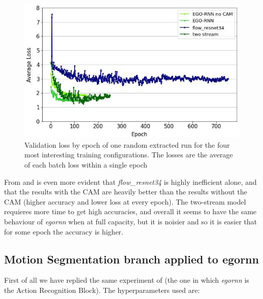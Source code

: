 \documentclass[10pt,twocolumn,hidelinks,letterpaper]{article}
\begin{document}
\begin{figure}[t]
	\centering
	\includegraphics[width=\linewidth]{images/step1_loss.jpg}
	\caption{Validation loss by epoch of one random extracted run for the four most interesting training configurations. The losses are the average of each batch loss within a single epoch}
	\label{step1_loss}
\end{figure}

From  and  is even more evident that \textit{flow\_resnet34} is highly inefficient alone, and that the results with the CAM are heavily better than the results without the CAM (higher accuracy and lower loss at every epoch). The two-stream model requieres more time to get high accuracies, and overall it seems to have the same behaviour of \textit{egornn} when at full capacity, but it is noisier and so it is easier that for some epoch the accuracy is higher.

\subsection{Motion Segmentation branch applied to egornn}

First of all we have replied the same experiment of \cite{sparnet} (the one in which \textit{egornn} is the Action Recognition Block). The hyperparameters used are:

\begin{center}
\end{center}
\end{document}
